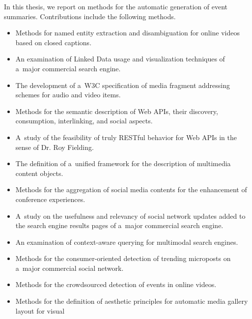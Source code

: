In this thesis, we report on methods for the automatic generation
of event summaries. Contributions include the following methods.

\begin{itemize}
  \item Methods for named entity extraction and disambiguation
        for online videos based on closed captions.
  \item An examination of Linked Data usage and visualization
        techniques of a~major commercial search engine.
  \item The development of a~W3C specification of media
        fragment addressing schemes for audio and video items.
  \item Methods for the semantic description of Web APIs,
        their discovery, consumption, interlinking,
        and social aspects.
  \item A~study of the feasibility of truly RESTful behavior
        for Web APIs in the sense of Dr. Roy Fielding.
  \item The definition of a~unified framework for the description
        of multimedia content objects.
  \item Methods for the aggregation of social media contents
        for the enhancement of conference experiences.
  \item A~study on the usefulness and relevancy of social network
        updates added to the search engine results pages of a~major
        commercial search engine.
  \item An examination of context-aware querying for multimodal
        search engines.
  \item Methods for the consumer-oriented detection of trending
        microposts on a~major commercial social network.
  \item Methods for the crowdsourced detection of events in
        online videos.
  \item Methods for the definition of aesthetic principles
        for automatic media gallery layout for visual

\end{itemize}

